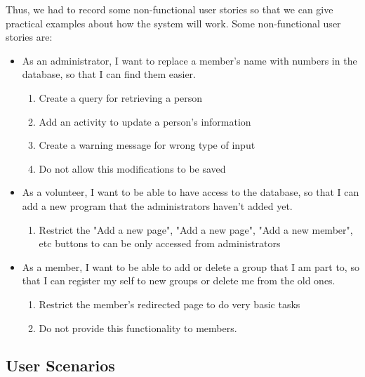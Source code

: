 \documentclass{l3proj}
\begin{document}
Thus, we had to record some non-functional user stories so that we can give practical examples about how the system will work. Some non-functional user stories are:

\begin{itemize}

\item  As an administrator, I want to replace a member's name with numbers in the database, so that I can find them easier.

	\begin{enumerate}
	
	\item Create a query for retrieving a person
	
	\item Add an activity to update a person's information
	
	\item Create a warning message for wrong type of input
	
	\item Do not allow this modifications to be saved
	\end{enumerate}
	
\item As a volunteer, I want to be able to have access to the database, so that I can add a new program that the administrators haven’t added yet.

	\begin{enumerate}
	\item Restrict the "Add a new page", "Add a new page", "Add a new member", etc buttons to can be only accessed from administrators
	\end{enumerate}
	
\item As a member, I want to be able to add or delete a group that I am part to, so that I can register my self to new groups or delete me from the old ones.

	\begin{enumerate}
	\item Restrict the member's redirected page to do very basic tasks
	\item Do not provide this functionality to members.
	\end{enumerate}

\end{itemize}

\subsection{User Scenarios}
\label{user_scenarios}
\end{document}
